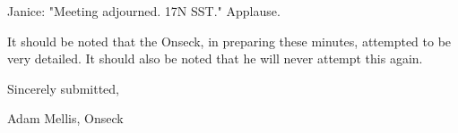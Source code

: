 \documentclass[12pt]{article}
\begin{document}
Janice: "Meeting adjourned. 17N SST." Applause.

\vspace{12pt}

\noindent
It should be noted that the Onseck, in preparing these minutes, attempted to be very detailed. It should also be noted that he will never attempt this again.

\vspace{18pt}

\centerline{Sincerely submitted,}
\centerline{Adam Mellis, Onseck}
\end{document}
